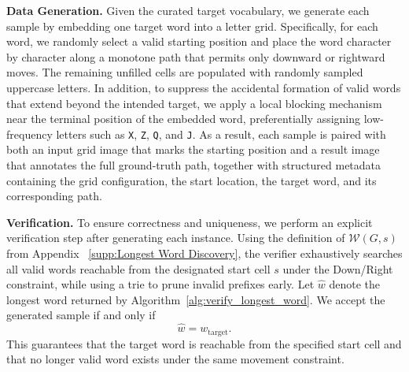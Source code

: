 \textbf{Data Generation.}
Given the curated target vocabulary, we generate each sample by embedding one
target word into a letter grid. Specifically, for each word, we randomly
select a valid starting position and place the word character by character
along a monotone path that permits only downward or rightward moves. 
The remaining unfilled cells are populated with randomly sampled uppercase letters. 
In addition, to suppress the accidental formation of valid words that
extend beyond the intended target, we apply a local blocking mechanism near
the terminal position of the embedded word, preferentially assigning
low-frequency letters such as \texttt{X}, \texttt{Z}, \texttt{Q}, and
\texttt{J}. As a result, each sample is paired with both an input grid image
that marks the starting position and a result image that annotates the full
ground-truth path, together with structured metadata containing the grid
configuration, the start location, the target word, and its corresponding
path.

\textbf{Verification.}
To ensure correctness and uniqueness, we perform an explicit verification step
after generating each instance. Using the definition of $\mathcal{W}(G,s)$ from Appendix ~\ref{supp:Longest Word Discovery}, the verifier exhaustively searches all valid words reachable from
the designated start cell $s$ under the Down/Right constraint, while using a
trie to prune invalid prefixes early. Let $\hat{w}$ denote the longest word
returned by Algorithm~\ref{alg:verify_longest_word}. We accept the generated
sample if and only if
\begin{equation}
    \hat{w} = w_{\text{target}}.
\end{equation}
This guarantees that the target word is reachable from the specified start cell
and that no longer valid word exists under the same movement constraint.

